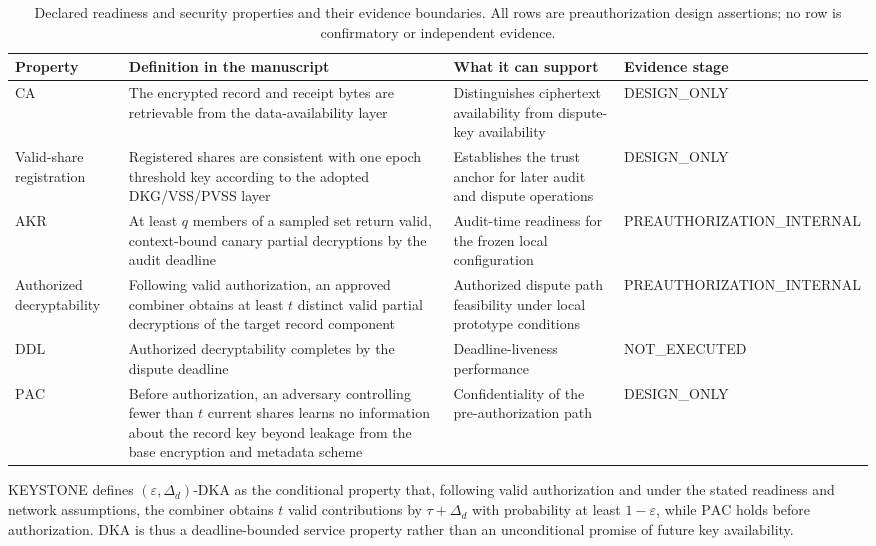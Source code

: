 \documentclass[10pt]{article}
\newcommand{\CA}{\mathrm{CA}}
\newcommand{\AKR}{\mathrm{AKR}}
\newcommand{\DDL}{\mathrm{DDL}}
\newcommand{\PAC}{\mathrm{PAC}}
\begin{document}
\begin{table}[h]
\centering
\caption{Declared readiness and security properties and their evidence boundaries. All rows are preauthorization design assertions; no row is confirmatory or independent evidence.}
\label{tab:properties}
\small
\begin{tabularx}{\textwidth}{>{\raggedright\arraybackslash}p{} X >{\raggedright\arraybackslash}p{} >{\raggedright\arraybackslash}p{}}
\toprule
Property & Definition in the manuscript & What it can support & Evidence stage\\
\midrule
$\CA$ & The encrypted record and receipt bytes are retrievable from the data-availability layer & Distinguishes ciphertext availability from dispute-key availability & DESIGN\_ONLY\\
Valid-share registration & Registered shares are consistent with one epoch threshold key according to the adopted DKG/VSS/PVSS layer & Establishes the trust anchor for later audit and dispute operations & DESIGN\_ONLY\\
$\AKR$ & At least $q$ members of a sampled set return valid, context-bound canary partial decryptions by the audit deadline & Audit-time readiness for the frozen local configuration & PREAUTHORIZATION\_INTERNAL\\
Authorized decryptability & Following valid authorization, an approved combiner obtains at least $t$ distinct valid partial decryptions of the target record component & Authorized dispute path feasibility under local prototype conditions & PREAUTHORIZATION\_INTERNAL\\
$\DDL$ & Authorized decryptability completes by the dispute deadline & Deadline-liveness performance & NOT\_EXECUTED\\
$\PAC$ & Before authorization, an adversary controlling fewer than $t$ current shares learns no information about the record key beyond leakage from the base encryption and metadata scheme & Confidentiality of the pre-authorization path & DESIGN\_ONLY\\
\bottomrule
\end{tabularx}
\end{table}

KEYSTONE defines $(\varepsilon,\Delta_d)$-DKA as the conditional property that, following valid authorization and under the stated readiness and network assumptions, the combiner obtains $t$ valid contributions by $\tau+\Delta_d$ with probability at least $1-\varepsilon$, while $\PAC$ holds before authorization. DKA is thus a deadline-bounded service property rather than an unconditional promise of future key availability.
\end{document}
